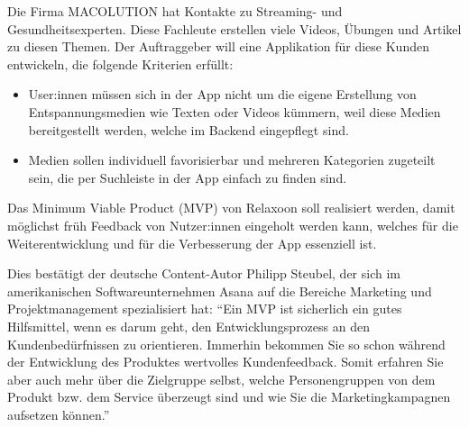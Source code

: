 
Die Firma MACOLUTION hat Kontakte zu Streaming- und Gesundheitsexperten. Diese Fachleute erstellen viele Videos, 
Übungen und Artikel zu diesen Themen. Der Auftraggeber will eine Applikation für diese Kunden entwickeln, die folgende
Kriterien erfüllt:

\begin{itemize}
    \item User:innen müssen sich in der App nicht um die eigene Erstellung von Entspannungsmedien wie Texten oder Videos
    kümmern, weil diese Medien bereitgestellt werden, welche im Backend eingepflegt sind.
    \item Medien sollen
    individuell favorisierbar und mehreren Kategorien zugeteilt sein, die per Suchleiste in der App einfach zu
    finden sind.
\end{itemize}

Das Minimum Viable Product (MVP) von Relaxoon soll realisiert werden, damit möglichst früh Feedback von Nutzer:innen
eingeholt werden kann, welches für die Weiterentwicklung und für die Verbesserung der App essenziell ist.

Dies bestätigt der deutsche Content-Autor Philipp Steubel, der sich im amerikanischen Softwareunternehmen Asana
auf die Bereiche Marketing und 
Projektmanagement spezialisiert hat: "`Ein MVP ist sicherlich ein gutes Hilfsmittel, wenn es darum geht, den 
Entwicklungsprozess an den Kundenbedürfnissen zu orientieren. Immerhin bekommen Sie so schon während der 
Entwicklung des Produktes wertvolles Kundenfeedback. Somit erfahren Sie aber auch mehr über die Zielgruppe 
selbst, welche Personengruppen von dem Produkt bzw. dem Service überzeugt sind und wie Sie die Marketingkampagnen
aufsetzen können."' \cite{mvp}





